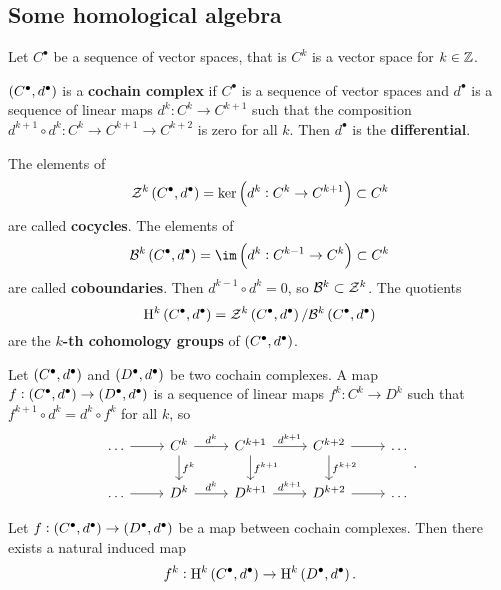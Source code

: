 \pagebreak

\subsection{Some homological algebra}

Let $ C^\bullet $ be a sequence of vector spaces, that is $ C^k $ is a vector space for $ k \in \mathbb{Z} $.

\begin{definition}
$ \br{C^\bullet, d^\bullet} $ is a \textbf{cochain complex} if $ C^\bullet $ is a sequence of vector spaces and $ d^\bullet $ is a sequence of linear maps $ d^k : C^k \to C^{k + 1} $ such that the composition $ d^{k + 1} \circ d^k : C^k \to C^{k + 1} \to C^{k + 2} $ is zero for all $ k $. Then $ d^\bullet $ is the \textbf{differential}.
\end{definition}

\begin{definition}
The elements of
$$ \ZZZ^k\br{C^\bullet, d^\bullet} = \ker \br{d^k : C^k \to C^{k + 1}} \subset C^k $$
are called \textbf{cocycles}. The elements of
$$ \BBB^k\br{C^\bullet, d^\bullet} = \im \br{d^k : C^{k - 1} \to C^k} \subset C^k $$
are called \textbf{coboundaries}. Then $ d^{k - 1} \circ d^k = 0 $, so $ \mathcal{B}^k \subset \mathcal{Z}^k $. The quotients
$$ \H^k\br{C^\bullet, d^\bullet} = \ZZZ^k\br{C^\bullet, d^\bullet} / \BBB^k\br{C^\bullet, d^\bullet} $$
are the \textbf{$ k $-th cohomology groups} of $ \br{C^\bullet, d^\bullet} $.
\end{definition}

\begin{definition}
Let $ \br{C^\bullet, d^\bullet} $ and $ \br{D^\bullet, d^\bullet} $ be two cochain complexes. A map $ f : \br{C^\bullet, d^\bullet} \to \br{D^\bullet, d^\bullet} $ is a sequence of linear maps $ f^k : C^k \to D^k $ such that $ f^{k + 1} \circ d^k = d^k \circ f^k $ for all $ k $, so
$$
\begin{tikzcd}
\dots \arrow{r} & C^k \arrow{r}{d^k} \arrow{d}{f^k} & C^{k + 1} \arrow{r}{d^{k + 1}} \arrow{d}{f^{k + 1}} & C^{k + 2} \arrow{r} \arrow{d}{f^{k + 2}} & \dots \\
\dots \arrow{r} & D^k \arrow{r}{d^k} & D^{k + 1} \arrow{r}{d^{k + 1}} & D^{k + 2} \arrow{r} & \dots
\end{tikzcd}.
$$
\end{definition}

\begin{proposition}
Let $ f : \br{C^\bullet, d^\bullet} \to \br{D^\bullet, d^\bullet} $ be a map between cochain complexes. Then there exists a natural induced map
$$ f^k : \H^k\br{C^\bullet, d^\bullet} \to \H^k\br{D^\bullet, d^\bullet}. $$
\end{proposition}

